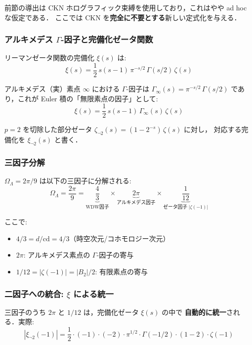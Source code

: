 前節の導出は CKN ホログラフィック束縛を使用しており，これはやや ad hoc な仮定である．
ここでは CKN を\textbf{完全に不要とする}新しい定式化を与える．

\subsubsection{アルキメデス $\Gamma$-因子と完備化ゼータ関数}

リーマンゼータ関数の完備化 $\xi(s)$ は:
\begin{equation}
\xi(s) = \frac{1}{2}\,s(s-1)\,\pi^{-s/2}\,\Gamma(s/2)\,\zeta(s)
\end{equation}

アルキメデス（実）素点 $\infty$ における $\Gamma$-因子は
$\Gamma_\infty(s) = \pi^{-s/2}\,\Gamma(s/2)$ であり，これが
Euler 積の「無限素点の因子」として:
\begin{equation}
\xi(s) = \frac{1}{2}\,s(s-1)\,\Gamma_\infty(s)\,\zeta(s)
\end{equation}

$p=2$ を切除した部分ゼータ $\zeta_{\neg 2}(s) = (1 - 2^{-s})\,\zeta(s)$ に対し，
対応する完備化を $\xi_{\neg 2}(s)$ と書く．

\subsubsection{三因子分解}

$\Omega_\Lambda = 2\pi/9$ は以下の三因子に分解される:
\begin{equation}
\boxed{
\Omega_\Lambda = \frac{2\pi}{9} = \underbrace{\frac{4}{3}}_{\text{WDW因子}}
\times \underbrace{2\pi}_{\text{アルキメデス因子}}
\times \underbrace{\frac{1}{12}}_{\text{ゼータ因子}\;|\zeta(-1)|}
}
\end{equation}

ここで:
\begin{itemize}
\item $4/3 = d/\mathrm{cd} = 4/3$（時空次元/コホモロジー次元）
\item $2\pi$: アルキメデス素点の $\Gamma$-因子の寄与
\item $1/12 = |\zeta(-1)| = |B_2|/2$: 有限素点の寄与
\end{itemize}

\subsubsection{二因子への統合: $\xi$ による統一}

三因子のうち $2\pi$ と $1/12$ は，完備化ゼータ $\xi(s)$ の中で
\textbf{自動的に統一}される．実際:
\begin{equation}
|\xi_{\neg 2}(-1)| = \frac{1}{2}\cdot(-1)\cdot(-2)\cdot\pi^{1/2}\cdot\Gamma(-1/2)
\cdot(1-2)\cdot\zeta(-1)
\end{equation}

